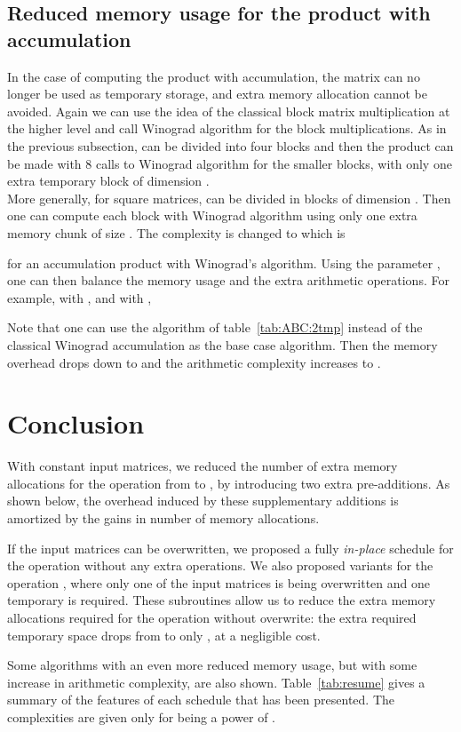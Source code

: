\documentclass{article}
\begin{document}
\subsection{Reduced memory usage for the product with accumulation}\label{sec:red}
In the case of computing the product with accumulation, the matrix  can no longer be used as temporary storage, and
extra memory allocation cannot be avoided.
Again we can use the idea of the classical block matrix multiplication at the
higher level and call Winograd algorithm for the block multiplications.
As in the previous subsection,  can be divided into
four blocks and then the product can be made with 8 calls to Winograd algorithm for
the smaller blocks, with only one extra temporary block of  dimension .\\
More generally, for square  matrices,
 can be divided in  blocks of dimension .
Then one can compute each block with Winograd algorithm using only
one extra memory chunk of size . The complexity is changed to
 which is

for an accumulation product with
Winograd's algorithm.
Using the parameter , one can then balance the memory usage
and the extra arithmetic operations. For example, with ,
 and
with ,

Note that one can use the algorithm of table~\ref{tab:ABC:2tmp} instead of
the classical Winograd accumulation as the base case algorithm.
Then the memory overhead drops down to  and the
arithmetic complexity increases to
.
\section{Conclusion}
With constant input matrices, we reduced the number of extra memory
allocations for the operation 
from  to ,
by introducing two extra pre-additions. As shown below, the
overhead induced by these supplementary additions is amortized by
the gains in number of memory allocations.

If the input matrices can be overwritten, we proposed a fully \textit{in-place}
schedule for the operation  without any extra operations.
We also proposed variants for the operation , where only
one of the input matrices is being overwritten and one temporary is
required.
These subroutines allow us to reduce the extra memory allocations
required for the  operation without overwrite: the extra required
temporary space drops from  to only , at a negligible cost.

Some algorithms with an even more reduced memory usage, but with some increase in arithmetic
complexity, are also shown.
Table~\ref{tab:resume} gives a summary of the features of each schedule that has been
presented.
The complexities are given only for  being a power of .
\end{document}
